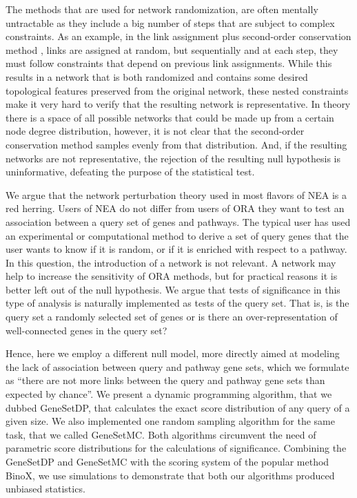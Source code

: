 \documentclass[10pt,letterpaper]{article}
\begin{document}
The methods that are used for network randomization, are often mentally untractable as they include a big number of steps that are subject to complex constraints.
As an example, in the link assignment plus second-order conservation method \cite{mccormack2013statistical}, links are assigned at random, but sequentially and at each step, they must follow constraints that depend on previous link assignments.
While this results in a network that is both randomized and contains some desired topological features preserved from the original network, these nested constraints make it very hard to verify that the resulting network is representative. In theory there is a space of all possible networks that could be made up from a certain node degree distribution, however, it is not clear that the second-order conservation method samples evenly from that distribution.  And, if the resulting networks are not representative, the rejection of the resulting null hypothesis is uninformative, defeating the purpose of the statistical test.

We argue that the network perturbation theory used in most flavors of NEA is a red herring. Users of NEA do not differ from users of ORA they want to test an association between a query set of genes and pathways.  The typical user has used an experimental or computational method to derive a set of query genes that the user wants to know if it is random, or if it is enriched with respect to a pathway.  In this question, the introduction of a network is not relevant. A network may help to increase the sensitivity of ORA methods, but for practical reasons it is better left out of the null hypothesis. We argue that tests of significance in this type of analysis is naturally implemented as tests of the query set. That is, is the query set a randomly selected set of genes or is there an over-representation of well-connected genes in the query set?

Hence, here we employ a different null model, more directly aimed at modeling the lack of association between query and pathway gene sets, which we formulate as ``there are not more links between the query and pathway gene sets than expected by chance''. We present a dynamic programming algorithm, that we dubbed GeneSetDP, that calculates the exact score distribution of any query of a given size. We also implemented one random sampling algorithm for the same task, that we called GeneSetMC. Both algorithms circumvent the need of parametric score distributions for the calculations of significance.
Combining the GeneSetDP and  GeneSetMC with the scoring system of the popular method BinoX, we use simulations to demonstrate that both our algorithms produced unbiased statistics.
\end{document}
